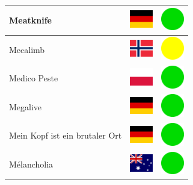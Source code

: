\documentclass[12pt, a4paper, twoside]{report}
\begin{document}
\begin{center}
\begin{longtable}{|p{5cm}|p{2cm}|p{2cm}|}
 Meatknife                                                  & \includegraphics[width=1cm]{../img/flags/de} &   \includegraphics[width=1cm]{../likes/y} \\ \hline
 Mecalimb                                                   & \includegraphics[width=1cm]{../img/flags/no} &   \includegraphics[width=1cm]{../likes/m} \\ \hline
 Medico Peste                                               & \includegraphics[width=1cm]{../img/flags/pl} &   \includegraphics[width=1cm]{../likes/y} \\ \hline
 Megalive                                                   & \includegraphics[width=1cm]{../img/flags/de} &   \includegraphics[width=1cm]{../likes/y} \\ \hline
 Mein Kopf ist ein brutaler Ort                             & \includegraphics[width=1cm]{../img/flags/de} &   \includegraphics[width=1cm]{../likes/y} \\ \hline
 Mélancholia                                                & \includegraphics[width=1cm]{../img/flags/au} &   \includegraphics[width=1cm]{../likes/y} \\ \hline

\end{longtable}
\end{center}
\end{document}
